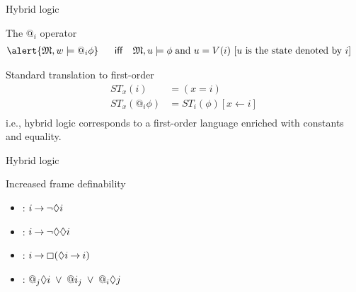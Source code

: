 \documentclass{beamer}
\begin{document}
\begin{slide}{Hybrid logic}\label{s:48}
\small

\begin{block}{The $@_i$ operator}
\begin{align*}
\alert{\ger{M}, w \models  @_i \phi}
  &&  \text{~ \textsf{iff} ~~}  &\ger{M}, u  \models \phi\; \text{and $u = V(i)$ [$u$ is the state denoted by $i$]}
\end{align*}
\end{block}

\begin{block}{Standard translation to first-order}
\begin{align*}
ST_x(i) & =  (x = i)\\
ST_x(@_i \phi) & =  ST_i(\phi)[x \leftarrow i]\\
\end{align*}
i.e., hybrid logic corresponds to a first-order language enriched with constants and equality.
\end{block}
\end{slide}




\begin{slide}{Hybrid logic}\label{s:49}
\small

\begin{block}{Increased frame definability}
\begin{itemize}
\item {}: $i \mathbin{\rightarrow} \neg \Diamond i$\\
\item {}: $i \mathbin{\rightarrow} \neg \Diamond \Diamond i$\\
\item {}: $i \mathbin{\rightarrow} \boxempty (\Diamond i \mathbin{\rightarrow} i)$\\
\item {}: $@_j \Diamond i\; \mathbin{\vee}\; @i_j    \; \mathbin{\vee}\;   @_i \Diamond j$
\end{itemize}
\end{block}

\end{slide}
\end{document}
